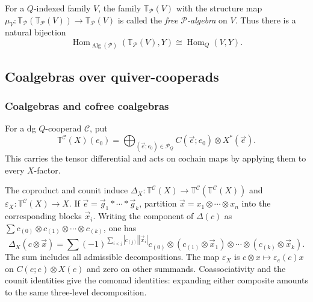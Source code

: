 \documentclass[11pt,letterpaper]{article}
\numberwithin{equation}{section}
\theoremstyle{plain}
\theoremstyle{definition}
\theoremstyle{remark}
\newcommand{\Hom}{\operatorname{Hom}}
\begin{document}
For a $Q$-indexed family $V$, the family $\mathbb T_{\mathscr P}(V)$ with the structure map
$ \mu_V:\mathbb T_{\mathscr P} (\mathbb T_{\mathscr P}(V) )
 \to \mathbb T_{\mathscr P}(V)$
is called the \textit{free $\mathscr P$-algebra} on $V$.
Thus there is a natural bijection
\begin{equation}\label{eq_free_algebra_universal_property}
 \operatorname{Hom}_{\operatorname{Alg}(\mathscr P)}
 (\mathbb T_{\mathscr P}(V),Y)\cong\Hom_Q(V,Y).
\end{equation}



\subsection{Coalgebras over quiver-cooperads}
\label{subsec:coalgebras_E_cooperads}

\subsubsection{Coalgebras and cofree coalgebras}
\label{sss_comonad_str_induced}
For a dg $Q$-cooperad $\mathscr C$, put
\begin{equation*} \mathbb T^{\mathscr C}(X)(e_0)
 =\bigoplus_{(\vec e;e_0)\in\mathcal P_Q}
     C(\vec e;e_0)\otimes X^*(\vec e).
\end{equation*}
This carries the tensor differential and acts on cochain maps by
applying them to every $X$-factor.

The coproduct and counit induce
$\Delta_X:\mathbb T^{\mathscr C}(X)\to
\mathbb T^{\mathscr C}(\mathbb T^{\mathscr C}(X))$ and
$\varepsilon_X:\mathbb T^{\mathscr C}(X)\to X$.
If $\vec e=\vec g_1*\cdots*\vec g_k$, partition
$\vec x=x_1\otimes\cdots\otimes x_n$ into the corresponding
blocks $\vec x_i$. Writing the component of $\Delta(c)$ as
$\sum c_{(0)}\otimes c_{(1)}\otimes\cdots\otimes c_{(k)}$, one has
\begin{equation*} \Delta_X(c\otimes\vec x)
 =\sum(-1)^{\sum_{i<j}|c_{(j)}||\vec x_i|}
 c_{(0)}\otimes(c_{(1)}\otimes\vec x_1)\otimes\cdots
              \otimes(c_{(k)}\otimes\vec x_k).
\end{equation*}
The sum includes all admissible decompositions. The map
$\varepsilon_X$ is $c\otimes x\mapsto\varepsilon_e(c)x$ on
$C(e;e)\otimes X(e)$ and zero on other summands.
Coassociativity and the counit identities give the comonad identities:
expanding either composite amounts to the same three-level
decomposition.
\end{document}
